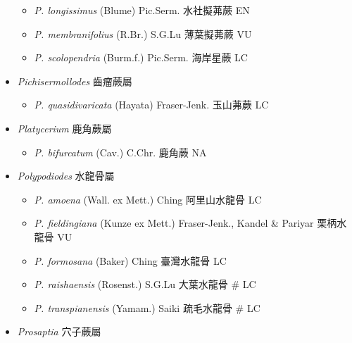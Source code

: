 \begin{itemize}
  \begin{itemize}
        \item[] \textit{P. longissimus} (Blume) Pic.Serm.  水社擬茀蕨   EN
        \item[] \textit{P. membranifolius} (R.Br.) S.G.Lu  薄葉擬茀蕨   VU
        \item[] \textit{P. scolopendria} (Burm.f.) Pic.Serm.  海岸星蕨   LC
  \end{itemize}
 \item[] \textit{Pichisermollodes} 齒瘤蕨屬
                                
  \begin{itemize}
        \item[] \textit{P. quasidivaricata} (Hayata) Fraser-Jenk.  玉山茀蕨   LC
  \end{itemize}
 \item[] \textit{Platycerium} 鹿角蕨屬
                                
  \begin{itemize}
        \item[] \textit{P. bifurcatum} (Cav.) C.Chr.  鹿角蕨   NA
  \end{itemize}
 \item[] \textit{Polypodiodes} 水龍骨屬
                                
  \begin{itemize}
        \item[] \textit{P. amoena} (Wall. ex Mett.) Ching  阿里山水龍骨   LC
        \item[] \textit{P. fieldingiana} (Kunze ex Mett.) Fraser-Jenk., Kandel \& Pariyar  栗柄水龍骨   VU
        \item[] \textit{P. formosana} (Baker) Ching  臺灣水龍骨   LC
        \item[] \textit{P. raishaensis} (Rosenst.) S.G.Lu  大葉水龍骨  \# LC
        \item[] \textit{P. transpianensis} (Yamam.) Saiki  疏毛水龍骨  \# LC
  \end{itemize}
 \item[] \textit{Prosaptia} 穴子蕨屬
                                

\end{itemize}
